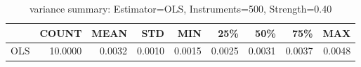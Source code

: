 \begin{table}[ht]
\centering
\caption{variance summary: Estimator=OLS, Instruments=500, Strength=0.40}
\begin{tabular}{lrrrrrrrr}
\toprule
 & COUNT & MEAN & STD & MIN & 25\% & 50\% & 75\% & MAX \\
\midrule
OLS & 10.0000 & 0.0032 & 0.0010 & 0.0015 & 0.0025 & 0.0031 & 0.0037 & 0.0048 \\
\bottomrule
\end{tabular}
\end{table}
